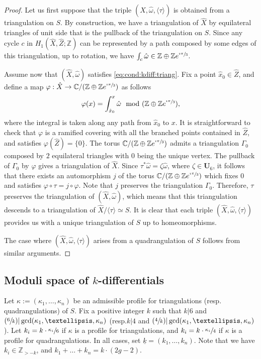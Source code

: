 \documentclass[11pt]{article}
\newcommand{\resp}{resp.\xspace}
\numberwithin{equation}{section}
\newcommand{\Psfrac}[2]{(\sfrac{#1}{#2})}
\theoremstyle{plain}
\theoremstyle{definition}
\def\C{\mathbb{C}}
\newcommand\Z{\mathbb{Z}}
\newcommand{\Ub}{\mathbf{U}}
\newcommand{\hx}{\hat{x}}
\newcommand{\hZ}{\hat{Z}}
\newcommand{\homg}{\hat{\omega}}
\let\G\Gamma
\let\ul\underline
\begin{document}
\begin{proof}
Let us first suppose that the triple $(\hat{X},\hat{\omega},\langle\tau\rangle)$ is obtained from a triangulation on $S$. By construction, we have a triangulation of $\hat{X}$ by equilateral triangles of unit side that is the pullback of the triangulation on $S$. Since any cycle $c$ in $H_1(\hat{X},\hat{Z};\Z)$ can be represented by a path composed by some edges of this triangulation, up to rotation, we have $\int_c\homg \in \Z\oplus\Z e^{\sfrac{\imath\pi}{3}}$.

Assume now that $(\hat{X},\hat{\omega})$ satisfies \eqref{eq:cond:kdiff:triang}. Fix a point $\hx_0 \in \hZ$, and define a map $\varphi: \hat{X} \to \C/(\Z\oplus\Z e^{\sfrac{\imath\pi}{3}})$ as follows
\[
\varphi(x)=\int_{\hat{x}_0}^x \hat{\omega} \mod (\Z\oplus\Z e^{\sfrac{\imath\pi}{3}}),
\]
where the integral is taken along any path from $\hat{x}_0$ to $x$.
It is straightforward to check that $\varphi$ is a ramified covering with all the branched points contained in $\hat{Z}$, and satisfies $\varphi(\hat{Z})=\{0\}$.
The torus $\C/(\Z\oplus\Z e^{\sfrac{\imath\pi}{3}})$ admits a triangulation $\G_0$ composed by $2$ equilateral triangles with $0$ being the unique vertex.
The pullback of $\G_0$ by $\varphi$ gives a triangulation of $\hat{X}$.
Since $\tau^*\hat{\omega}=\zeta\hat{\omega}$, where $\zeta \in \Ub_6$, it follows that there exists an automorphism $j$ of the torus $\C/(\Z\oplus\Z e^{\sfrac{\imath\pi}{3}})$ which fixes $0$ and satisfies $\varphi\circ\tau=j\circ\varphi$. Note that $j$ preserves the triangulation $\G_0$.
Therefore, $\tau$ preserves the triangulation of $(\hat{X},\hat{\omega})$, which means that
this triangulation descends to a triangulation of $\hat{X}/\langle \tau \rangle\simeq S$.
It is clear that each triple $(\hat{X},\hat{\omega},\langle \tau \rangle)$ provides us with a unique triangulation of $S$ up to homeomorphisms.

The case where $(\hat{X},\hat{\omega},\langle \tau \rangle)$ arises from a quadrangulation of $S$ follows from similar arguments.
\end{proof}

\subsection{Moduli space of $k$-differentials}\label{sec:mod:sp:kdiff}
Let $\kappa:=(\kappa_1,\dots,\kappa_n)$ be an admissible profile for triangulations (\resp quadrangulations) of $S$. Fix a positive integer $k$ such that $k|6$ and $\Psfrac{6}{k} | \gcd(\kappa_1,\dots,\kappa_n)$ (\resp $k | 4$ and $\Psfrac{4}{k} | \gcd(\kappa_1,\dots,\kappa_n)$). Let $k_i=k\cdot\sfrac{\kappa_i}{6}$ if $\kappa$ is a profile for triangulations, and $k_i=k\cdot\sfrac{\kappa_i}{4}$ if $\kappa$ is a profile for quadrangulations. In all cases, set $\ul{k}=(k_1,\dots,k_n)$.
Note that we have $k_i\in \Z_{>-k}$, and $k_1+\dots+k_n=k\cdot(2g-2)$.
\end{document}
